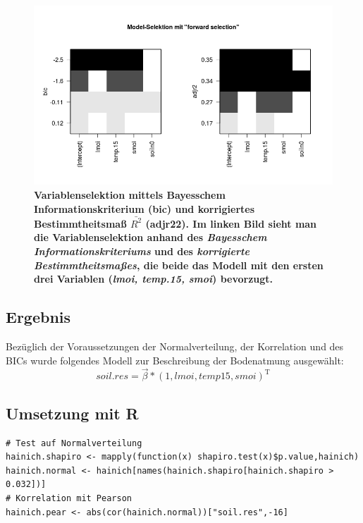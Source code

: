 \begin{figure}[ht]
	\centering
	\includegraphics[width=\textwidth]{fig/model/variablenselektion-bic-adjr2.png}
	\caption{\bf{Variablenselektion mittels Bayesschem Informationskriterium (bic) und korrigiertes Bestimmtheitsmaß $\bar{R^2}$ (adjr22)}. Im linken Bild sieht man die Variablenselektion anhand des \emph{Bayesschem Informationskriteriums} und des \emph{korrigierte Bestimmtheitsmaßes}, die beide das Modell mit den ersten drei Variablen (\emph{lmoi, temp.15, smoi}) bevorzugt.}
    \label{fig:bic}
\end{figure}

\subsection{Ergebnis}
Bezüglich der Voraussetzungen der Normalverteilung, der Korrelation und des BICs wurde folgendes Modell zur Beschreibung der Bodenatmung ausgewählt:
$$soil.res = \vec{\beta} * (1,lmoi,temp15,smoi)^\text{T}$$

\subsection{Umsetzung mit R}

\begin{lstlisting}
# Test auf Normalverteilung
hainich.shapiro <- mapply(function(x) shapiro.test(x)$p.value,hainich)
hainich.normal <- hainich[names(hainich.shapiro[hainich.shapiro > 0.032])]
# Korrelation mit Pearson
hainich.pear <- abs(cor(hainich.normal))["soil.res",-16]
\end{lstlisting}
